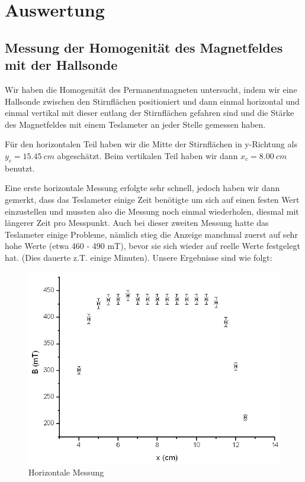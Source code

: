 \clearpage
\section{Auswertung}

\subsection{Messung der Homogenität des Magnetfeldes mit der Hallsonde}

Wir haben die Homogenität des Permanentmagneten untersucht, indem wir eine Hallsonde zwischen den Stirnflächen positioniert und dann einmal horizontal und einmal vertikal mit dieser entlang der Stirnflächen gefahren sind und die Stärke des Magnetfeldes mit einem Teslameter an jeder Stelle gemessen haben.

Für den horizontalen Teil haben wir die Mitte der Stirnflächen in y-Richtung als $y_c = 15.45\ cm$ abgeschätzt. Beim vertikalen Teil haben wir dann $x_c = 8.00\ cm$ benutzt.

Eine erste horizontale Messung erfolgte sehr schnell, jedoch haben wir dann gemerkt, dass das Teslameter einige Zeit benötigte um sich auf einen festen Wert einzustellen und mussten also die Messung noch einmal wiederholen, diesmal mit längerer Zeit pro Messpunkt. Auch bei dieser zweiten Messung hatte das Teslameter einige Probleme, nämlich stieg die Anzeige manchmal zuerst auf sehr hohe Werte (etwa 460 - 490 mT), bevor sie sich wieder auf reelle Werte festgelegt hat. (Dies dauerte z.T. einige Minuten). Unsere Ergebnisse sind wie folgt:

\begin{figure}[H]
\centering \includegraphics[width=\textwidth]{Bilder/Hallx.png}
\caption{Horizontale Messung}
\end{figure}

